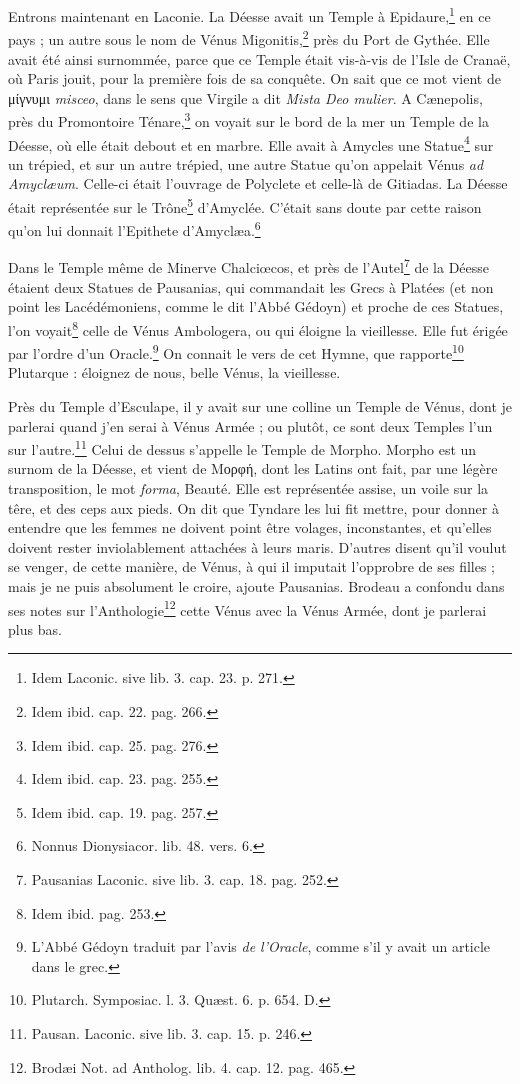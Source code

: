 \documentclass[a4paper, 18pt, oneside]{article}
\begin{document}
Entrons maintenant en Laconie. La Déesse avait un Temple à Epidaure,\footnote{Idem Laconic. sive lib. 3. cap. 23. p. 271.} en ce pays ; un autre sous le nom de Vénus Migonitis,\footnote{Idem ibid. cap. 22. pag. 266.} près du Port de Gythée. Elle avait été ainsi surnommée, parce que ce Temple était vis-à-vis de l'Isle de Cranaë, où Paris jouit, pour la première fois de sa conquête. On sait que ce mot vient de μίγνυμι \emph{misceo}, dans le sens que Virgile a dit \emph{Mista Deo mulier}. A Cænepolis, près du Promontoire Ténare,\footnote{Idem ibid. cap. 25. pag. 276.} on voyait sur le bord de la mer un Temple de la Déesse, où elle était debout et en marbre. Elle avait à Amycles une Statue\footnote{Idem ibid. cap. 23. pag. 255.} sur un trépied, et sur un autre trépied, une autre Statue qu'on appelait Vénus \emph{ad Amyclæum}. Celle-ci était l'ouvrage de Polyclete et celle-là de Gitiadas. La Déesse était représentée sur le Trône\footnote{Idem ibid. cap. 19. pag. 257.} d'Amyclée. C'était sans doute par cette raison qu'on lui donnait l'Epithete d'Amyclæa.\footnote{Nonnus Dionysiacor. lib. 48. vers. 6.}

Dans le Temple même de Minerve Chalciœcos, et près de l'Autel\footnote{Pausanias Laconic. sive lib. 3. cap. 18. pag. 252.} de la Déesse étaient deux Statues de Pausanias, qui commandait les Grecs à Platées (et non point les Lacédémoniens, comme le dit l'Abbé Gédoyn) et proche de ces Statues, l'on voyait\footnote{Idem ibid. pag. 253.} celle de Vénus Ambologera, ou qui éloigne la vieillesse. Elle fut érigée par l'ordre d'un Oracle.\footnote{L'Abbé Gédoyn traduit par l'avis \emph{de l'Oracle}, comme s'il y avait un article dans le grec.} On connait le vers de cet Hymne, que rapporte\footnote{Plutarch. Symposiac. l. 3. Quæst. 6. p. 654. D.} Plutarque : éloignez de nous, belle Vénus, la vieillesse.

Près du Temple d'Esculape, il y avait sur une colline un Temple de Vénus, dont je parlerai quand j'en serai à Vénus Armée ; ou plutôt, ce sont deux Temples l'un sur l'autre.\footnote{Pausan. Laconic. sive lib. 3. cap. 15. p. 246.} Celui de dessus s'appelle le Temple de Morpho. Morpho est un surnom de la Déesse, et vient de Μορφή, dont les Latins ont fait, par une légère transposition, le mot \emph{forma}, Beauté. Elle est représentée assise, un voile sur la têre, et des ceps aux pieds. On dit que Tyndare les lui fit mettre, pour donner à entendre que les femmes ne doivent point être volages, inconstantes, et qu'elles doivent rester inviolablement attachées à leurs maris. D'autres disent qu'il voulut se venger, de cette manière, de Vénus, à qui il imputait l'opprobre de ses filles ; mais je ne puis absolument le croire, ajoute Pausanias. Brodeau a confondu dans ses notes sur l'Anthologie\footnote{Brodæi Not. ad Antholog. lib. 4. cap. 12. pag. 465.} cette Vénus avec la Vénus Armée, dont je parlerai plus bas.
\end{document}
